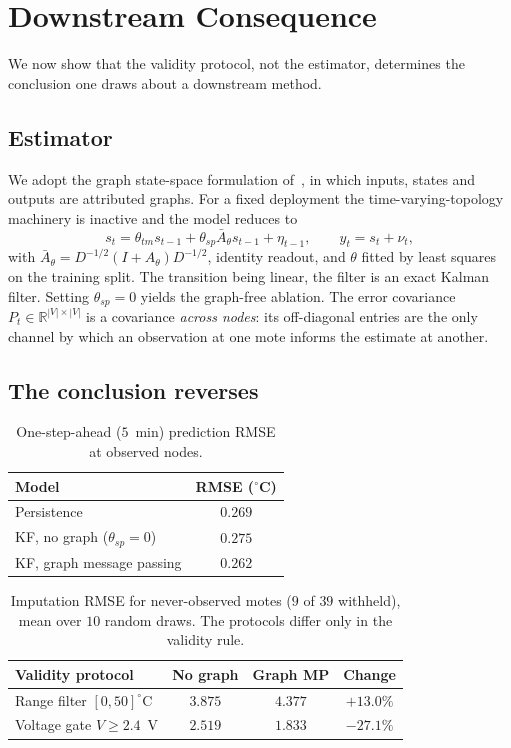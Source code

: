 \documentclass[conference]{IEEEtran}
\begin{document}
\section{Downstream Consequence}
\label{sec:downstream}

We now show that the validity protocol, not the estimator, determines the
conclusion one draws about a downstream method.

\subsection{Estimator}

We adopt the graph state-space formulation of~\cite{alippi2023}, in which
inputs, states and outputs are attributed graphs. For a fixed deployment the
time-varying-topology machinery is inactive and the model reduces to
\begin{equation}
s_t = \theta_{tm} s_{t-1} + \theta_{sp} \bar{A}_\theta s_{t-1} + \eta_{t-1},
\qquad y_t = s_t + \nu_t,
\label{eq:model}
\end{equation}
with $\bar{A}_\theta = D^{-1/2}(I + A_\theta) D^{-1/2}$, identity readout, and
$\theta$ fitted by least squares on the training split. The transition being
linear, the filter is an exact Kalman filter. Setting $\theta_{sp} = 0$ yields
the graph-free ablation. The error covariance
$P_t \in \mathbb{R}^{|V| \times |V|}$ is a covariance \emph{across nodes}: its
off-diagonal entries are the only channel by which an observation at one mote
informs the estimate at another.

\subsection{The conclusion reverses}

\begin{table}[t]
\caption{One-step-ahead ($5$~min) prediction RMSE at observed nodes.}
\label{tab:onestep}
\centering
\begin{tabular}{lc}
\toprule
Model & RMSE ($^\circ$C) \\
\midrule
Persistence & $0.269$ \\
KF, no graph ($\theta_{sp} = 0$) & $0.275$ \\
KF, graph message passing & $\mathbf{0.262}$ \\
\bottomrule
\end{tabular}
\end{table}

\begin{table}[t]
\caption{Imputation RMSE for never-observed motes ($9$ of $39$ withheld), mean
over $10$ random draws. The protocols differ only in the validity rule.}
\label{tab:holdout}
\centering
\begin{tabular}{lccc}
\toprule
Validity protocol & No graph & Graph MP & Change \\
\midrule
Range filter $[0,50]^\circ$C & $3.875$ & $4.377$ & $+13.0\%$ \\
Voltage gate $V \ge 2.4$~V & $2.519$ & $\mathbf{1.833}$ & $\mathbf{-27.1\%}$ \\
\bottomrule
\end{tabular}
\end{table}
\end{document}

